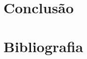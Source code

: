 


\newpage
\tableofcontents
\newpage
\newpage


\newpage

\newpage

\newpage
\section{Conclusão}%
\newpage
\section{Bibliografia}
%


